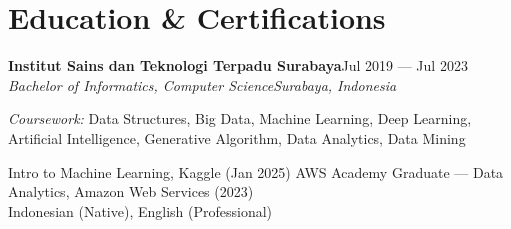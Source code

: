 \documentclass[10pt]{article}
\newcommand{\entry}[4]{\textbf{#1}\hfill #2\\\textit{#3}\hfill\textit{#4}\par}
\begin{document}
\section{Education \& Certifications}
\entry{Institut Sains dan Teknologi Terpadu Surabaya}{Jul 2019 — Jul 2023}{Bachelor of Informatics, Computer Science}{Surabaya, Indonesia}
{\small\textit{Coursework:} Data Structures, Big Data, Machine Learning, Deep Learning, Artificial Intelligence, Generative Algorithm, Data Analytics, Data Mining}\par\smallskip
Intro to Machine Learning, Kaggle (Jan 2025) \textbullet{} AWS Academy Graduate — Data Analytics, Amazon Web Services (2023)\\
Indonesian (Native), English (Professional)
\end{document}
